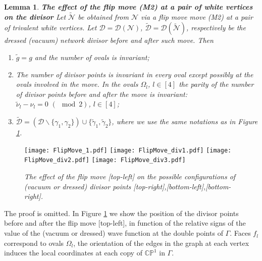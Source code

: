 \documentclass[11pt]{amsart}
\theoremstyle{plain}
\numberwithin{equation}{section}
\newtheorem{lemma}[theorem]{Lemma}
\begin{document}
\begin{lemma}\label{lemma:poles_move2}\textbf{The effect of the flip move (M2) at a pair of white vertices on the divisor}
Let ${\tilde {\mathcal N}}$ be obtained from $\mathcal N$ via a flip move move (M2) at a pair of trivalent white vertices. 
Let ${\mathcal D}= {\mathcal D}({\mathcal N})$, ${\tilde {\mathcal D}}= {\mathcal D}({\tilde {\mathcal N}})$, respectively be the dressed (vacuum) network divisor before and after such move. Then
\begin{enumerate}
\item ${\tilde g}=g$ and the number of ovals is invariant;
\item The number of divisor points is invariant in every oval except possibly at the ovals involved in the move.
In the ovals $\Omega_l$, $l\in [4]$ the parity of the number of divisor points before and after the move is invariant:
 ${\tilde \nu}_{l} -\nu_{l} = 0 \,\,(\!\!\!\!\mod 2)$, $l\in [4]$;
\item ${\tilde {\mathcal D}} = \left( {\mathcal D}\backslash \{ \gamma_1, \gamma_2 \} \right) \cup \{ {\tilde \gamma}_1, {\tilde \gamma}_2 \}$, where we use the same notations as in Figure \ref{fig:flip_move_poles}.
\end{enumerate} 
\end{lemma}


\begin{figure}%
 \centering
	\texttt{[image: FlipMove\_1.pdf]}
	\hfill
	\texttt{[image: FlipMove\_div1.pdf]}
	\texttt{[image: FlipMove\_div2.pdf]}
	\hfill
	\texttt{[image: FlipMove\_div3.pdf]}
  \caption{\small{\sl The effect of the flip move [top-left] on the possible configurations of (vacuum or dressed) divisor points [top-right],[bottom-left],[bottom-right].}\label{fig:flip_move_poles}}
\end{figure}

The proof is omitted. In Figure \ref{fig:flip_move_poles} we show the position of the divisor points before and after the flip move [top-left], in function of the relative signs of the value of the (vacuum or dressed) wave function at the double points of $\Gamma$. Faces $f_l$ correspond to ovals $\Omega_l$, the orientation of the edges in the graph at each vertex induces the local coordinates at each copy of $\mathbb{CP}^1$ in $\Gamma$.
\end{document}
